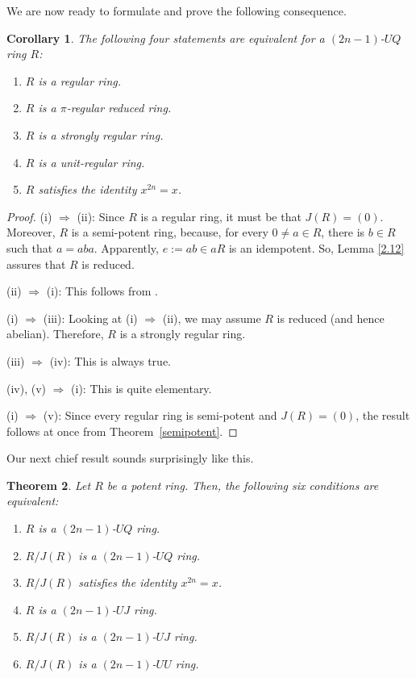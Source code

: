 \documentclass[12pt]{amsart}
\newtheorem{theorem}{Theorem}[section]
\newtheorem{corollary}[theorem]{Corollary}
\theoremstyle{definition}
\begin{document}
\medskip

We are now ready to formulate and prove the following consequence.

\begin{corollary}
The following four statements are equivalent for a $(2n-1)$-$UQ$ ring \(R\):
\begin{enumerate}
\item	
$R$ is a regular ring.
\item	
$R$ is a $\pi$-regular reduced ring.
\item	
$R$ is a strongly regular ring.
\item	
$R$ is a unit-regular ring.
\item	
$R$ satisfies the identity $x^{2n}=x$.
\end{enumerate}
\end{corollary}

\begin{proof}
(i) $\Rightarrow$ (ii): Since \( R \) is a regular ring, it must be that \( J(R) = (0) \). Moreover, \( R \) is a semi-potent ring, because, for every \( 0 \neq a \in R \), there is \( b \in R \) such that \( a = aba \). Apparently, \( e := ab \in aR \) is an idempotent. So, Lemma \ref{2.12} assures that \( R \) is reduced.
	
(ii) $\Rightarrow$ (i): This follows from \cite[Theorem 3]{10}.
	
(i) $\Rightarrow$ (iii): Looking at (i) $\Rightarrow$ (ii), we may assume $R$ is reduced (and hence abelian). Therefore, $R$ is a strongly regular ring.
	
(iii) $\Rightarrow$ (iv): This is always true.
	
(iv), (v) $\Rightarrow$ (i): This is quite elementary.
	
(i) $\Rightarrow$ (v): Since every regular ring is semi-potent and $J(R)=(0)$, the result follows at once from Theorem~\ref{semipotent}.
\end{proof}

Our next chief result sounds surprisingly like this.

\begin{theorem}\label{potent}
Let $R$ be a potent ring. Then, the following six conditions are equivalent:
\begin{enumerate}
\item	
$R$ is a $(2n-1)$-$UQ$ ring.
\item	
$R/J(R)$ is a $(2n-1)$-$UQ$ ring.
\item	
$R/J(R)$ satisfies the identity $x^{2n}=x$.
\item	
$R$ is a $(2n-1)$-$UJ$ ring.
\item	
$R/J(R)$ is a $(2n-1)$-$UJ$ ring.
\item	
$R/J(R)$ is a $(2n-1)$-$UU$ ring.
\end{enumerate}
\end{theorem}
\end{document}
